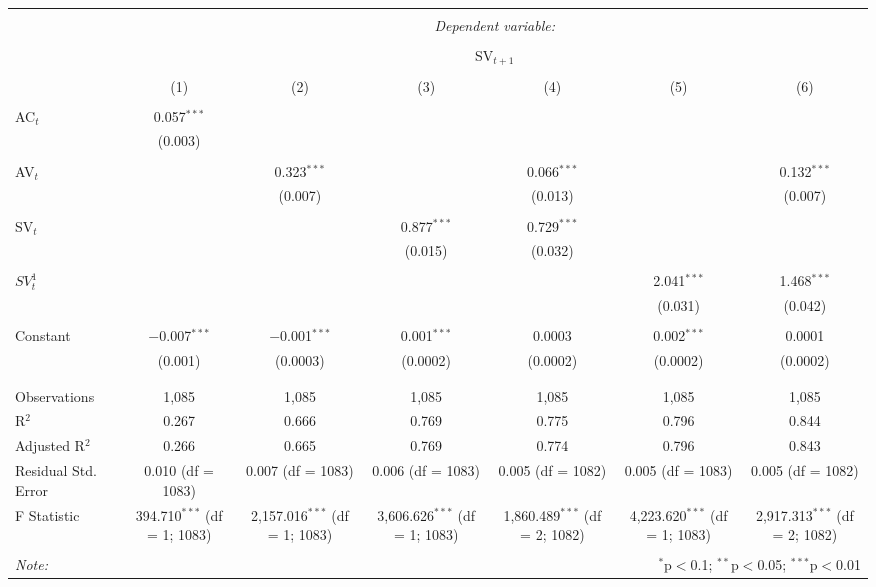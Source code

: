 
\begin{table}[!htbp] \centering 
  \caption{} 
  \label{} 
\begin{tabular}{@{\extracolsep{5pt}}lcccccc} 
\\[-1.8ex]\hline 
\hline \\[-1.8ex] 
 & \multicolumn{6}{c}{\textit{Dependent variable:}} \\ 
\cline{2-7} 
\\[-1.8ex] & \multicolumn{6}{c}{SV$_{t+1}$} \\ 
\\[-1.8ex] & (1) & (2) & (3) & (4) & (5) & (6)\\ 
\hline \\[-1.8ex] 
 AC$_{t}$ & 0.057$^{***}$ &  &  &  &  &  \\ 
  & (0.003) &  &  &  &  &  \\ 
  & & & & & & \\ 
 AV$_{t}$ &  & 0.323$^{***}$ &  & 0.066$^{***}$ &  & 0.132$^{***}$ \\ 
  &  & (0.007) &  & (0.013) &  & (0.007) \\ 
  & & & & & & \\ 
 SV$_{t}$ &  &  & 0.877$^{***}$ & 0.729$^{***}$ &  &  \\ 
  &  &  & (0.015) & (0.032) &  &  \\ 
  & & & & & & \\ 
 $SV^{1}_{t}$ &  &  &  &  & 2.041$^{***}$ & 1.468$^{***}$ \\ 
  &  &  &  &  & (0.031) & (0.042) \\ 
  & & & & & & \\ 
 Constant & $-$0.007$^{***}$ & $-$0.001$^{***}$ & 0.001$^{***}$ & 0.0003 & 0.002$^{***}$ & 0.0001 \\ 
  & (0.001) & (0.0003) & (0.0002) & (0.0002) & (0.0002) & (0.0002) \\ 
  & & & & & & \\ 
\hline \\[-1.8ex] 
Observations & 1,085 & 1,085 & 1,085 & 1,085 & 1,085 & 1,085 \\ 
R$^{2}$ & 0.267 & 0.666 & 0.769 & 0.775 & 0.796 & 0.844 \\ 
Adjusted R$^{2}$ & 0.266 & 0.665 & 0.769 & 0.774 & 0.796 & 0.843 \\ 
Residual Std. Error & 0.010 (df = 1083) & 0.007 (df = 1083) & 0.006 (df = 1083) & 0.005 (df = 1082) & 0.005 (df = 1083) & 0.005 (df = 1082) \\ 
F Statistic & 394.710$^{***}$ (df = 1; 1083) & 2,157.016$^{***}$ (df = 1; 1083) & 3,606.626$^{***}$ (df = 1; 1083) & 1,860.489$^{***}$ (df = 2; 1082) & 4,223.620$^{***}$ (df = 1; 1083) & 2,917.313$^{***}$ (df = 2; 1082) \\ 
\hline 
\hline \\[-1.8ex] 
\textit{Note:}  & \multicolumn{6}{r}{$^{*}$p$<$0.1; $^{**}$p$<$0.05; $^{***}$p$<$0.01} \\ 
\end{tabular} 
\end{table} 
